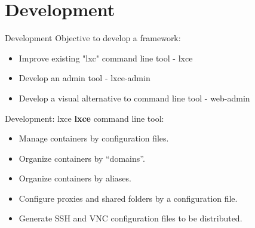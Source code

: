 \documentclass[10pt,english,handout,aspectradio=169]{beamer}
\begin{document}
\section{Development}
\begin{frame}{Development}
Objective to develop a framework:
   \begin{itemize}
       \item Improve existing "lxc" command line tool - lxce
       \item Develop an admin tool - lxce-admin
       \item Develop a visual alternative to command line tool - web-admin
   \end{itemize} 
\end{frame}
\begin{frame}{Development: lxce}
    \textbf{lxce} command line tool:
    \begin{itemize}
        \item Manage containers by configuration files.
        \item Organize containers by ``domains''.
        \item Organize containers by aliases.
        \item Configure proxies and shared folders by a configuration file.
        \item Generate SSH and VNC configuration files to be distributed.
    \end{itemize}
\end{frame}
\end{document}
